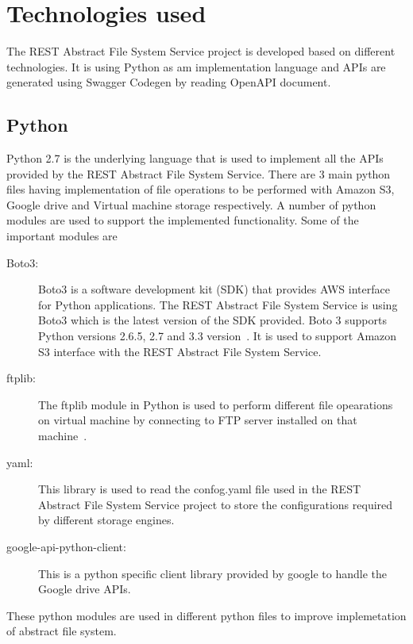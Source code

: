 \section{Technologies used}

The REST Abstract File System Service project is developed based on
different technologies. It is using Python as am implementation
language and APIs are generated using Swagger Codegen by reading
OpenAPI document.

\subsection{Python}

Python 2.7 is the underlying language that is used to implement all
the APIs provided by the REST Abstract File System Service.  There are
3 main python files having implementation of file operations to be
performed with Amazon S3, Google drive and Virtual machine storage
respectively. A number of python modules are used to support the
implemented functionality. Some of the important modules are

\begin{description}

\item[Boto3:] Boto3 is a software development kit (SDK) that provides
  AWS interface for Python applications. The REST Abstract File System
  Service is using Boto3 which is the latest version of the SDK
  provided. Boto 3 supports Python versions 2.6.5, 2.7 and 3.3
  version~\cite{hid-sp18-420-boto}.  It is used to support Amazon S3
  interface with the REST Abstract File System Service.

\item[ftplib:] The ftplib module in Python is used to perform
  different file opearations on virtual machine by connecting to FTP
  server installed on that machine~\cite{hid-sp18-420-FTP}.

\item[yaml:] This library is used to read the confog.yaml file used in
  the REST Abstract File System Service project to store the
  configurations required by different storage engines.

\item[google-api-python-client:] This is a python specific client
  library provided by google to handle the Google drive APIs.

\end{description}

These python modules are used in different python files to improve 
implemetation of abstract file system.


